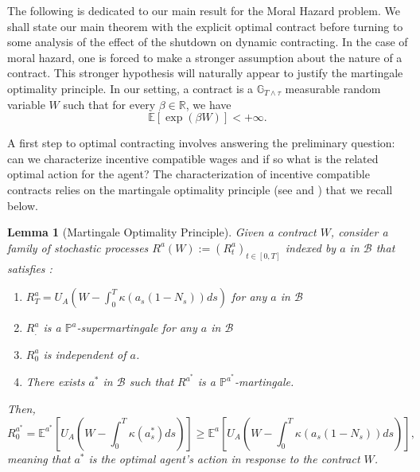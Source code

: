 \documentclass[numbook, envcountsect, envcountsame, envcountreset, runningheads, smallextended]{article}
\newtheorem{Lemma}{Lemma}[part]
\def \E{\mathbb{E}}
\def \R{\mathbb{R}}
\begin{document}
The following is dedicated to our main result for the Moral Hazard problem. We shall state our main theorem with the explicit optimal contract before turning to some analysis of the effect of the shutdown on dynamic contracting.
In the case of moral hazard, one is forced to make a stronger assumption about the nature of a contract. This stronger hypothesis will naturally appear to justify the martingale optimality principle. In our setting, a contract is a $\mathbb{G}_{T\wedge \tau}$ measurable random variable $W$  such that for every $\beta \in \R$,  we have
$$
\E\left[ \exp(\beta W)\right]<+\infty.
$$   

A first step to optimal contracting involves answering the preliminary question:  can we characterize incentive compatible wages and if so what is the related optimal action for the agent?
The characterization of incentive compatible contracts relies on the martingale optimality principle (see \cite{HIM:2005} and \cite{Rouge:2000}) that we recall below.
\begin{Lemma}[Martingale Optimality Principle]
\label{lem:MOP}
Given a contract $W$, consider a family of stochastic processes $R^{a}(W) := (R_t^a)_{t \in [0,T]}$ indexed by $a$ in $\mathcal{B}$ that satisfies : 
\begin{enumerate}
\item $R_T^a = U_A(W - \int_0^T \kappa(a_s(1-N_s)) ds)$ for any $a$ in $\mathcal{B}$
\item $R^a_.$ is a $\mathbb{P}^{a}$-supermartingale  for any $a$ in $\mathcal{B}$
\item $R^a_0$ is independent of $a$.
\item There exists $a^*$ in $\mathcal{B}$ such that $R^{a^*}$ is a  $\mathbb{P}^{a^*}$-martingale.
\end{enumerate}
Then,
$$
R_0^{a^*}=\E^{a^*}\left[ U_A(W - \int_0^T \kappa(a^*_s) ds)\right] \ge \E^{a}\left[ U_A(W - \int_0^T \kappa(a_s(1-N_s)) ds)\right],
$$
meaning that $a^*$ is the optimal agent’s action in response to the contract $W$. 
\end{Lemma}
\end{document}
